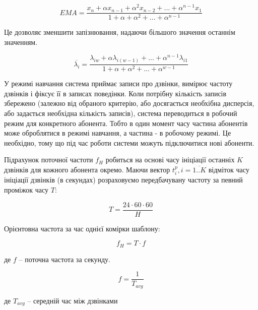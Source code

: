 \begin{equation}\label{eq:ema_nonrecursive}EMA = \frac{{x}_{n} + \alpha {x}_{n -1} + {\alpha} ^ {2} {x}_{n -2} +...+ {\alpha} ^ {n -1} {x}_{1}}{1+ \alpha + {\alpha} ^ {2} +...+ {\alpha} ^ {n -1}} \end{equation}

Це дозволяє зменшити запізнювання, надаючи більшого значення останнім значенням.

\begin{equation}\label{eq:ema_lambda}\overline{{\lambda}_{i}} = \frac{{\lambda}_{i w} + \alpha {\lambda}_{i(w -1)} +...+ {\alpha} ^ {n -1} {\lambda}_{i1}}{1+ \alpha + {\alpha} ^ {2} +...+ {\alpha} ^ {w -1}} \end{equation}

У режимі навчання система приймає записи про дзвінки, вимірює частоту дзвінків і фіксує її в записах поведінки. Коли потрібну кількість записів збережено (залежно від обраного критерію, або досягається необхібна дисперсія, або задається необхідна кількість записів), система переводиться в робочий режим для конкретного абонента. Тобто в один момент часу частина абонентів може оброблятися в режимі навчання, а частина - в робочому режимі. Це необхідно, тому що під час роботи системи можуть підключитися нові абоненти.

Підрахунок поточної частоти $f_{H}$ робиться на основі часу ініціації останніх $K$ дзвінків для кожного абонента окремо. Маючи вектор $t_i^{p}, i = \overline{1..K}$ відміток часу ініціації дзвінків (в секундах) розраховуємо передбачувану частоту за певний проміжок часу $T$:

\begin{equation}\label{eq:time_duration} T = \frac{24 \cdot 60 \cdot 60}{H} \end{equation}

Орієнтовна частота за час однієї комірки шаблону:

\begin{equation}\label{eq:one_freq} f_H = T \cdot f \end{equation}
\begin{ESKDexplanation}
  \item де $f$ -- поточна частота за секунду.
\end{ESKDexplanation}

\begin{equation}\label{eq:cur_freq} f = \frac{1}{T_{avg}} \end{equation}
\begin{ESKDexplanation}
  \item де $T_{avg}$ -- середній час між дзвінками
\end{ESKDexplanation}

